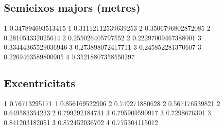 \documentclass[11pt]{article}
\begin{document}
    \subsection{Semieixos majors (metres)}\label{semieixos-majors-metres}

1 0.347894693513415 1 0.31112112539639253 2 0.3506796802872085 2
0.281054332025614 2 0.255026405797552 2 0.22297009467388001 3
0.33444365529036946 3 0.273898072417711 3 0.245852281370607 3
0.2269463589800905 4 0.35218807358550297

    \subsection{Excentricitats}\label{excentricitats}

1 0.76713295171 1 0.856169522906 2 0.749271880628 2 0.567176539821 2
0.649583354233 2 0.799292184731 3 0.795909590917 3 0.7298676301 3
0.841203182051 3 0.872452036702 4 0.775304115012


    
    
    
    
\end{document}
